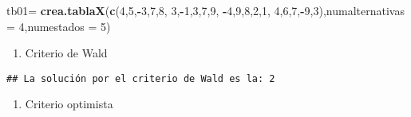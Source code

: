 \documentclass[
]{article}
\newenvironment{Shaded}{\begin{snugshade}}{\end{snugshade}}
\newcommand{\AttributeTok}[1]{\textcolor[rgb]{0.13,0.29,0.53}{#1}}
\newcommand{\ConstantTok}[1]{\textcolor[rgb]{0.56,0.35,0.01}{#1}}
\newcommand{\DecValTok}[1]{\textcolor[rgb]{0.00,0.00,0.81}{#1}}
\newcommand{\FunctionTok}[1]{\textcolor[rgb]{0.13,0.29,0.53}{\textbf{#1}}}
\newcommand{\NormalTok}[1]{#1}
\newcommand{\OtherTok}[1]{\textcolor[rgb]{0.56,0.35,0.01}{#1}}
\newcommand{\SpecialCharTok}[1]{\textcolor[rgb]{0.81,0.36,0.00}{\textbf{#1}}}
\newcommand{\StringTok}[1]{\textcolor[rgb]{0.31,0.60,0.02}{#1}}
\providecommand{\tightlist}{%
  \setlength{\itemsep}{0pt}\setlength{\parskip}{0pt}}
\begin{document}
\begin{Shaded}
\begin{Highlighting}[]
\NormalTok{tb01}\OtherTok{=} \FunctionTok{crea.tablaX}\NormalTok{(}\FunctionTok{c}\NormalTok{(}\DecValTok{4}\NormalTok{,}\DecValTok{5}\NormalTok{,}\SpecialCharTok{{-}}\DecValTok{3}\NormalTok{,}\DecValTok{7}\NormalTok{,}\DecValTok{8}\NormalTok{,}
                    \DecValTok{3}\NormalTok{,}\SpecialCharTok{{-}}\DecValTok{1}\NormalTok{,}\DecValTok{3}\NormalTok{,}\DecValTok{7}\NormalTok{,}\DecValTok{9}\NormalTok{,}
                    \SpecialCharTok{{-}}\DecValTok{4}\NormalTok{,}\DecValTok{9}\NormalTok{,}\DecValTok{8}\NormalTok{,}\DecValTok{2}\NormalTok{,}\DecValTok{1}\NormalTok{,}
                    \DecValTok{4}\NormalTok{,}\DecValTok{6}\NormalTok{,}\DecValTok{7}\NormalTok{,}\SpecialCharTok{{-}}\DecValTok{9}\NormalTok{,}\DecValTok{3}\NormalTok{),}\AttributeTok{numalternativas =} \DecValTok{4}\NormalTok{,}\AttributeTok{numestados =} \DecValTok{5}\NormalTok{)}
\end{Highlighting}
\end{Shaded}

\begin{enumerate}
\def\labelenumi{\arabic{enumi}.}
\tightlist
\item
  Criterio de Wald
\end{enumerate}

\begin{Shaded}
\end{Shaded}

\begin{verbatim}
## La solución por el criterio de Wald es la: 2
\end{verbatim}

\begin{enumerate}
\def\labelenumi{\arabic{enumi}.}
\setcounter{enumi}{1}
\tightlist
\item
  Criterio optimista
\end{enumerate}

\begin{Shaded}
\end{Shaded}
\end{document}
